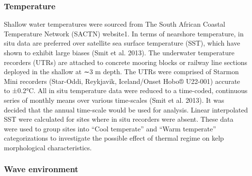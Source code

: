 \documentclass[
  a4paper,
]{article}
\begin{document}
\hypertarget{temperature}{%
\subsubsection{Temperature}\label{temperature}}

Shallow water temperatures were sourced from The South African Coastal
Temperature Network (SACTN) website1. In terms of nearshore temperature,
in situ data are preferred over satellite sea surface temperature (SST),
which have shown to exhibit large biases (Smit et al. 2013). The
underwater temperature recorders (UTRs) are attached to concrete mooring
blocks or railway line sections deployed in the shallow at ∼3 m depth.
The UTRs were comprised of Starmon Mini recorders (Star-Oddi, Reykjavik,
Iceland/Onset Hobo® U22-001) accurate to ±0.2°C. All in situ temperature
data were reduced to a time-coded, continuous series of monthly means
over various time-scales (Smit et al. 2013). It was decided that the
annual time-scale would be used for analysis. Linear interpolated SST
were calculated for sites where in situ recorders were absent. These
data were used to group sites into ``Cool temperate'' and ``Warm
temperate'' categorizations to investigate the possible effect of
thermal regime on kelp morphological characteristics.

\hypertarget{wave-environment}{%
\subsubsection{Wave environment}\label{wave-environment}}
\end{document}
